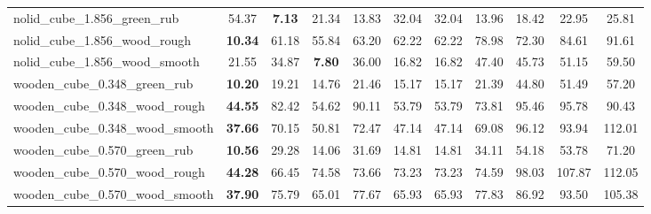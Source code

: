 \begin{table}[H]
{\begin{tabular}{l cccccccccc}
        nolid\_cube\_1.856\_green\_rub & 54.37 & \textbf{7.13} & 21.34 & 13.83 & 32.04 & 32.04 & 13.96 & 18.42 & 22.95 & 25.81 \\
        nolid\_cube\_1.856\_wood\_rough & \textbf{10.34} & 61.18 & 55.84 & 63.20 & 62.22 & 62.22 & 78.98 & 72.30 & 84.61 & 91.61 \\
        nolid\_cube\_1.856\_wood\_smooth & 21.55 & 34.87 & \textbf{7.80} & 36.00 & 16.82 & 16.82 & 47.40 & 45.73 & 51.15 & 59.50 \\
        wooden\_cube\_0.348\_green\_rub & \textbf{10.20} & 19.21 & 14.76 & 21.46 & 15.17 & 15.17 & 21.39 & 44.80 & 51.49 & 57.20 \\
        wooden\_cube\_0.348\_wood\_rough & \textbf{44.55} & 82.42 & 54.62 & 90.11 & 53.79 & 53.79 & 73.81 & 95.46 & 95.78 & 90.43 \\
        wooden\_cube\_0.348\_wood\_smooth & \textbf{37.66} & 70.15 & 50.81 & 72.47 & 47.14 & 47.14 & 69.08 & 96.12 & 93.94 & 112.01 \\
        wooden\_cube\_0.570\_green\_rub & \textbf{10.56} & 29.28 & 14.06 & 31.69 & 14.81 & 14.81 & 34.11 & 54.18 & 53.78 & 71.20 \\
        wooden\_cube\_0.570\_wood\_rough & \textbf{44.28} & 66.45 & 74.58 & 73.66 & 73.23 & 73.23 & 74.59 & 98.03 & 107.87 & 112.05 \\
        wooden\_cube\_0.570\_wood\_smooth & \textbf{37.90} & 75.79 & 65.01 & 77.67 & 65.93 & 65.93 & 77.83 & 86.92 & 93.50 & 105.38 \\
        \bottomrule
    \end{tabular}
    }
\end{table}
